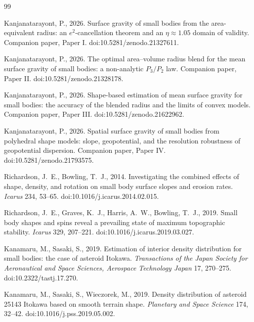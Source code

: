 \documentclass[11pt,a4paper]{article}
\newcommand{\Ptwo}{P_{2}}
\newcommand{\Pthree}{P_{3}}
\begin{document}
\begin{thebibliography}{99}

Kanjanatarayont, P., 2026. Surface gravity of small bodies from the
area-equivalent radius: an $e^{2}$-cancellation theorem and an
{$\eta \approx 1.05$} domain of validity. Companion paper, Paper I.
doi:10.5281/zenodo.21327611.

Kanjanatarayont, P., 2026. The optimal area--volume radius blend for the
mean surface gravity of small bodies: a non-analytic $\Pthree/\Ptwo$ law.
Companion paper, Paper II. doi:10.5281/zenodo.21328178.

Kanjanatarayont, P., 2026. Shape-based estimation of mean surface gravity
for small bodies: the accuracy of the blended radius and the limits of
convex models. Companion paper, Paper III. doi:10.5281/zenodo.21622962.

Kanjanatarayont, P., 2026. Spatial surface gravity of small bodies from
polyhedral shape models: slope, geopotential, and the resolution
robustness of geopotential dispersion. Companion paper, Paper IV.
doi:10.5281/zenodo.21793575.

Richardson, J.~E., Bowling, T.~J., 2014. Investigating the combined
effects of shape, density, and rotation on small body surface slopes and
erosion rates. \emph{Icarus} 234, 53--65.
doi:10.1016/j.icarus.2014.02.015.

Richardson, J.~E., Graves, K.~J., Harris, A.~W., Bowling, T.~J., 2019.
Small body shapes and spins reveal a prevailing state of maximum
topographic stability. \emph{Icarus} 329, 207--221.
doi:10.1016/j.icarus.2019.03.027.

Kanamaru, M., Sasaki, S., 2019. Estimation of interior density
distribution for small bodies: the case of asteroid Itokawa.
\emph{Transactions of the Japan Society for Aeronautical and Space
Sciences, Aerospace Technology Japan} 17, 270--275.
doi:10.2322/tastj.17.270.

Kanamaru, M., Sasaki, S., Wieczorek, M., 2019. Density distribution of
asteroid 25143 Itokawa based on smooth terrain shape. \emph{Planetary and
Space Science} 174, 32--42. doi:10.1016/j.pss.2019.05.002.


\end{thebibliography}
\end{document}

